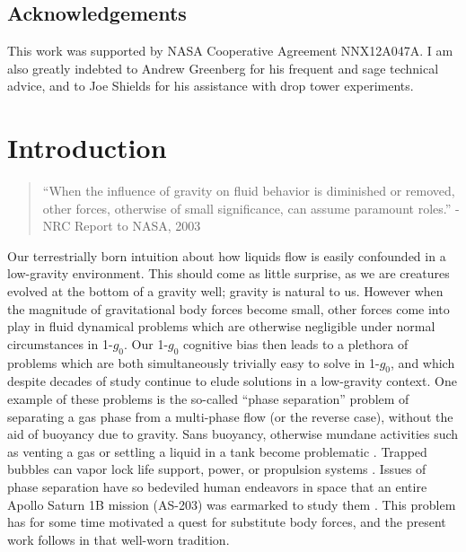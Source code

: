 \documentclass[12pt,a4paper,oneside]{book}
\newcommand\blankpage{%
    \null
    \thispagestyle{empty}%
    \addtocounter{page}{-1}%
    \newpage}
\begin{document}

\vspace*{\fill}
\section*{Acknowledgements}

This work was supported by NASA Cooperative Agreement NNX12A047A. I am also greatly indebted to Andrew Greenberg for his frequent and sage technical advice, and to Joe Shields for his assistance with drop tower experiments. \\ 
\vspace*{\fill}
\clearpage

\tableofcontents
\afterpage{\blankpage}
\listoffigures
\afterpage{\blankpage}

\mainmatter
\chapter{Introduction}
\begin{quote}
``When the influence of gravity on fluid behavior is diminished or removed, other forces, otherwise of small significance, can assume paramount roles.''
- NRC Report to NASA, 2003  \cite{motil_priorities_2012}
\end{quote}

Our terrestrially born intuition about how liquids flow is easily confounded in a low-gravity environment. This should come as little surprise, as we are creatures evolved at the bottom of a gravity well; gravity is natural to us. However when the magnitude of gravitational body forces become small, other forces come into play in fluid dynamical problems which are otherwise negligible under normal circumstances in 1-$g_0$. Our 1-$g_0$ cognitive bias then leads to a plethora of problems which are both simultaneously trivially easy to solve in 1-$g_0$, and which despite decades of study continue to elude solutions in a low-gravity context. One example of these problems is the so-called ``phase separation'' problem of separating a gas phase from a multi-phase flow (or the reverse case), without the aid of buoyancy due to gravity. Sans buoyancy, otherwise mundane activities such as venting a gas or settling a liquid in a tank become problematic \cite{petrash_controlling_1964}. Trapped bubbles can vapor lock life support, power, or propulsion systems \cite{jenson_passive_2014}. Issues of phase separation have so bedeviled human endeavors in space that an entire Apollo Saturn 1B mission (AS-203) was earmarked to study them \cite{hastings_[saturn_1965}. This problem has for some time motivated a quest for substitute body forces, and the present work follows in that well-worn tradition.
\end{document}
